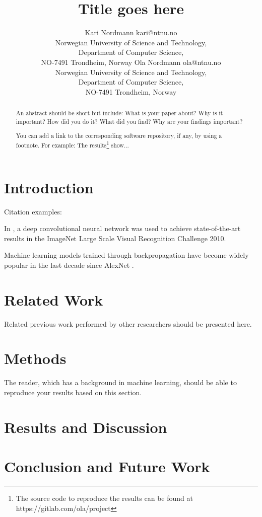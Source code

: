 \documentclass[10pt]{article}
\begin{document}
\title{Title goes here}


\author{\name Kari Nordmann
  \email kari@ntnu.no\\
  \addr Norwegian University of Science and Technology,\\
  Department of Computer Science,\\ NO-7491 Trondheim, Norway
  \AND
  \name Ola Nordmann
  \email ola@ntnu.no\\
  \addr Norwegian University of Science and Technology,\\
  Department of Computer Science,\\
  NO-7491 Trondheim, Norway
}


\maketitle


\begin{abstract}
An abstract should be short but include: What is your paper about? Why is it important? How did you do it? What did you find? Why are your findings important?

You can add a link to the corresponding software repository, if any, by using a footnote. For example: The results\footnote{The source code to reproduce the results can be found at https://gitlab.com/ola/project} show...
\end{abstract}

\section{Introduction}

Citation examples:

In \citet{krizhevsky2012imagenet}, a deep convolutional neural network was used to achieve state-of-the-art results in the ImageNet Large Scale Visual Recognition Challenge 2010. 

Machine learning models trained through backpropagation have become widely popular in the last decade
since AlexNet \citep{krizhevsky2012imagenet}.

\section{Related Work}

Related previous work performed by other researchers should be presented here.

\section{Methods}

The reader, which has a background in machine learning, should be able to reproduce your results based on this section.

\section{Results and Discussion}

\section{Conclusion and Future Work}



\end{document}
